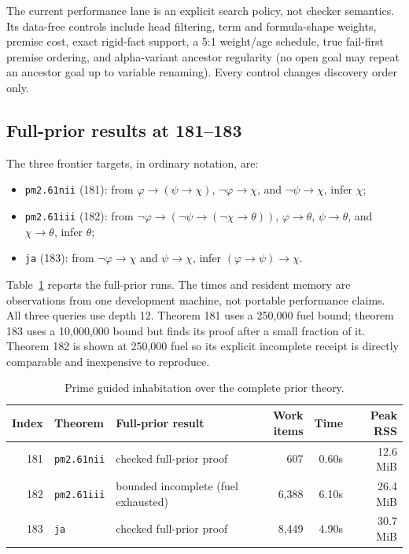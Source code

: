 \documentclass[10pt]{article}
\begin{document}
The current performance lane is an explicit search policy, not checker
semantics.  Its data-free controls include head filtering, term and
formula-shape weights, premise cost, exact rigid-fact support, a 5:1
weight/age schedule, true fail-first premise ordering, and alpha-variant
ancestor regularity (no open goal may repeat an ancestor goal up to variable
renaming).  Every control changes discovery order only.

\subsection{Full-prior results at 181--183}

The three frontier targets, in ordinary notation, are:
\begin{itemize}
\item \texttt{pm2.61nii} (181): from $\varphi\to(\psi\to\chi)$,
  $\neg\varphi\to\chi$, and $\neg\psi\to\chi$, infer $\chi$;
\item \texttt{pm2.61iii} (182): from
  $\neg\varphi\to(\neg\psi\to(\neg\chi\to\theta))$, $\varphi\to\theta$,
  $\psi\to\theta$, and $\chi\to\theta$, infer $\theta$;
\item \texttt{ja} (183): from $\neg\varphi\to\chi$ and $\psi\to\chi$,
  infer $(\varphi\to\psi)\to\chi$.
\end{itemize}

Table~\ref{tab:direct} reports the full-prior runs.  The
times and resident memory are observations from one development machine, not
portable performance claims.  All three queries use depth 12.  Theorem 181
uses a 250,000 fuel bound; theorem 183 uses a 10,000,000 bound but finds its
proof after a small fraction of it.  Theorem 182 is shown at 250,000 fuel so
its explicit incomplete receipt is directly comparable and inexpensive to
reproduce.

\begin{table}[ht]
\centering
\small
\begin{tabularx}{\linewidth}{@{}r l X r r r@{}}
\toprule
Index & Theorem & Full-prior result & Work items & Time & Peak RSS\\
\midrule
181 & \texttt{pm2.61nii} & checked full-prior proof & 607 & 0.60s & 12.6 MiB\\
182 & \texttt{pm2.61iii} & bounded incomplete (fuel exhausted) & 6,388 & 6.10s & 26.4 MiB\\
183 & \texttt{ja} & checked full-prior proof & 8,449 & 4.90s & 30.7 MiB\\
\bottomrule
\end{tabularx}
\caption{Prime guided inhabitation over the complete prior theory.}
\label{tab:direct}
\end{table}
\end{document}
